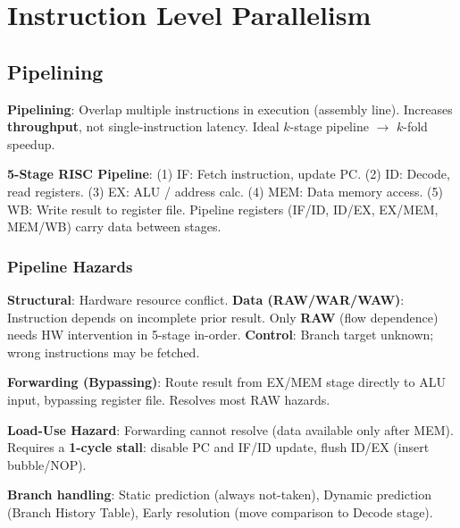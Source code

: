 \section{Instruction Level Parallelism}

\subsection{Pipelining}

\begin{definition}
	\textbf{Pipelining}: Overlap multiple instructions in execution (assembly line). Increases \textbf{throughput}, not single-instruction latency. Ideal $k$-stage pipeline $\to$ $k$-fold speedup.
\end{definition}

\begin{definition}
	\textbf{5-Stage RISC Pipeline}: (1) IF: Fetch instruction, update PC. (2) ID: Decode, read registers. (3) EX: ALU / address calc. (4) MEM: Data memory access. (5) WB: Write result to register file. Pipeline registers (IF/ID, ID/EX, EX/MEM, MEM/WB) carry data between stages.
\end{definition}

\subsubsection{Pipeline Hazards}

\begin{definition}
	\textbf{Structural}: Hardware resource conflict.
	\textbf{Data (RAW/WAR/WAW)}: Instruction depends on incomplete prior result. Only \textbf{RAW} (flow dependence) needs HW intervention in 5-stage in-order.
	\textbf{Control}: Branch target unknown; wrong instructions may be fetched.
\end{definition}

\begin{lemma}
	\textbf{Forwarding (Bypassing)}: Route result from EX/MEM stage directly to ALU input, bypassing register file. Resolves most RAW hazards.
\end{lemma}

\begin{important}
	\textbf{Load-Use Hazard}: Forwarding cannot resolve (data available only after MEM). Requires a \textbf{1-cycle stall}: disable PC and IF/ID update, flush ID/EX (insert bubble/NOP).
\end{important}

\begin{remark}
	\textbf{Branch handling}: Static prediction (always not-taken), Dynamic prediction (Branch History Table), Early resolution (move comparison to Decode stage).
\end{remark}

